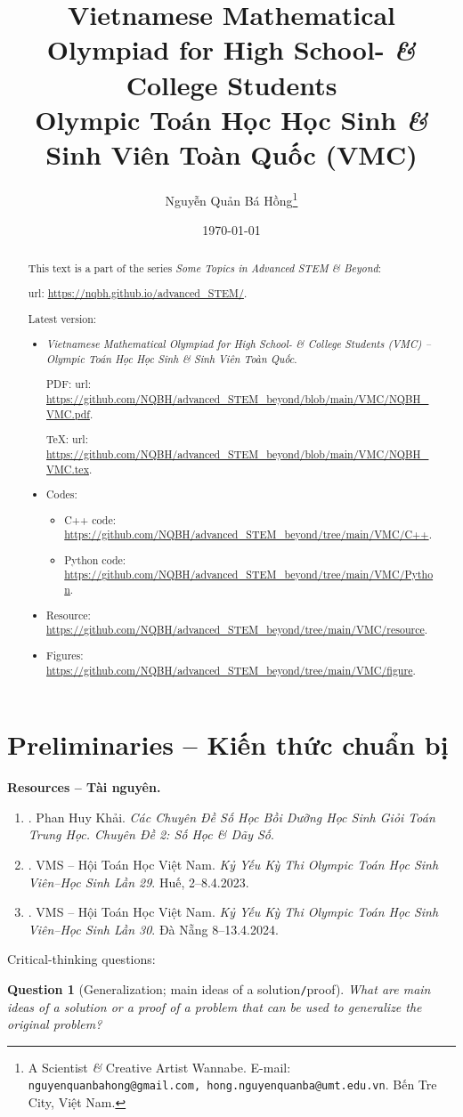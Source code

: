 \documentclass{article}
\title{Vietnamese Mathematical Olympiad for High School- {\it\&} College Students\\Olympic Toán Học Học Sinh {\it\&} Sinh Viên Toàn Quốc (VMC)}
\author{Nguyễn Quản Bá Hồng\footnote{A Scientist {\it\&} Creative Artist Wannabe. E-mail: {\tt nguyenquanbahong@gmail.com, hong.nguyenquanba@umt.edu.vn}. Bến Tre City, Việt Nam.}}
\date{\today}
\newtheorem{question}{Question}
\begin{document}
\maketitle
\begin{abstract}
	This text is a part of the series {\it Some Topics in Advanced STEM \& Beyond}:
	
	{\sc url}: \url{https://nqbh.github.io/advanced_STEM/}.
	
	Latest version:
	\begin{itemize}
		\item {\it Vietnamese Mathematical Olympiad for High School- \& College Students (VMC) -- Olympic Toán Học Học Sinh \& Sinh Viên Toàn Quốc}.
		
		PDF: {\sc url}: \url{https://github.com/NQBH/advanced_STEM_beyond/blob/main/VMC/NQBH_VMC.pdf}.
		
		\TeX: {\sc url}: \url{https://github.com/NQBH/advanced_STEM_beyond/blob/main/VMC/NQBH_VMC.tex}.
		\item Codes:
		\begin{itemize}
			\item C++ code: \url{https://github.com/NQBH/advanced_STEM_beyond/tree/main/VMC/C++}.
			\item Python code: \url{https://github.com/NQBH/advanced_STEM_beyond/tree/main/VMC/Python}.
		\end{itemize}
		\item Resource: \url{https://github.com/NQBH/advanced_STEM_beyond/tree/main/VMC/resource}.
		\item Figures: \url{https://github.com/NQBH/advanced_STEM_beyond/tree/main/VMC/figure}.
	\end{itemize}
\end{abstract}
\tableofcontents


\section*{Preliminaries -- Kiến thức chuẩn bị}

\textbf{\textsf{Resources -- Tài nguyên.}}
\begin{enumerate}
	\item \cite{Khai_so_hoc_day_so}. {\sc Phan Huy Khải}. {\it Các Chuyên Đề Số Học Bồi Dưỡng Học Sinh Giỏi Toán Trung Học. Chuyên Đề 2: Số Học \& Dãy Số}.
	\item \cite{VMS_VMC2023}. {\sc VMS -- Hội Toán Học Việt Nam}. {\it Kỷ Yếu Kỳ Thi Olympic Toán Học Sinh Viên--Học Sinh Lần 29}. Huế, 2--8.4.2023.
	\item \cite{VMS_VMC2024}. {\sc VMS -- Hội Toán Học Việt Nam}. {\it Kỷ Yếu Kỳ Thi Olympic Toán Học Sinh Viên--Học Sinh Lần 30}. Đà Nẵng 8--13.4.2024.
\end{enumerate}
Critical-thinking questions:
\begin{question}[Generalization; main ideas of a solution{\tt/}proof]
	What are main ideas of a solution or a proof of a problem that can be used to generalize the original problem?
\end{question}
\end{document}
